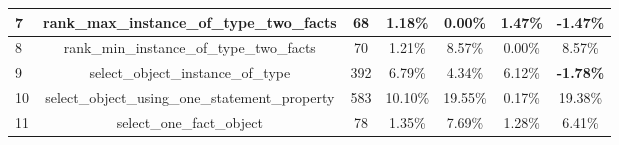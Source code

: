\begin{table}[h!]
{\begin{tabular}{|l|c|cc|cc|c|}
    7                            & rank\_max\_instance\_of\_type\_two\_facts                                                                              & 68                                                  & 1.18\%                                                                          & 0.00\%                                                                                                     & 1.47\%                                                                                 & \textbf{-1.47\%}                        \\ \hline
    8                            & rank\_min\_instance\_of\_type\_two\_facts                                                                              & 70                                                  & 1.21\%                                                                          & 8.57\%                                                                                                     & 0.00\%                                                                                 & 8.57\%                                  \\ \hline
    9                            & select\_object\_instance\_of\_type                                                                                     & 392                                                 & 6.79\%                                                                          & 4.34\%                                                                                                     & 6.12\%                                                                                 & \textbf{-1.78\%}                        \\ \hline
    10                           & select\_object\_using\_one\_statement\_property                                                                        & 583                                                 & 10.10\%                                                                         & 19.55\%                                                                                                    & 0.17\%                                                                                 & 19.38\%                                 \\ \hline
    11                           & select\_one\_fact\_object                                                                                              & 78                                                  & 1.35\%                                                                          & 7.69\%                                                                                                     & 1.28\%                                                                                 & 6.41\%                                  \\ \hline

\end{tabular}}
\end{table}
